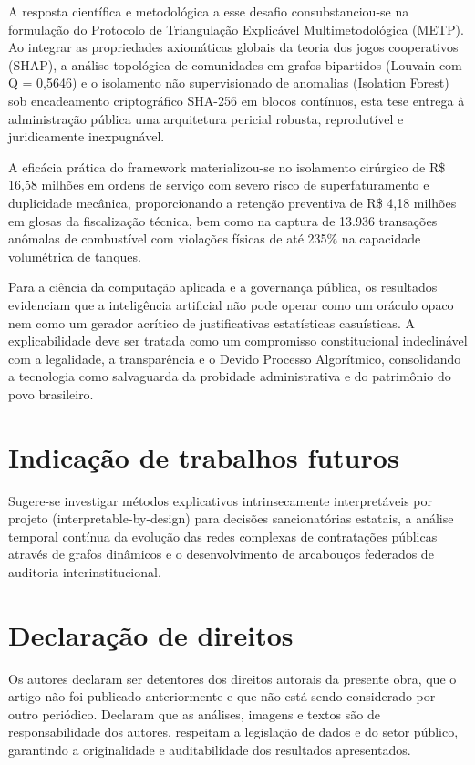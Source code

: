 \documentclass[12pt,a4paper]{article}
\begin{document}
A resposta científica e metodológica a esse desafio consubstanciou-se na formulação do Protocolo de Triangulação Explicável Multimetodológica (METP). Ao integrar as propriedades axiomáticas globais da teoria dos jogos cooperativos (SHAP), a análise topológica de comunidades em grafos bipartidos (Louvain com Q = 0,5646) e o isolamento não supervisionado de anomalias (Isolation Forest) sob encadeamento criptográfico SHA-256 em blocos contínuos, esta tese entrega à administração pública uma arquitetura pericial robusta, reprodutível e juridicamente inexpugnável.

A eficácia prática do framework materializou-se no isolamento cirúrgico de R\$ 16,58 milhões em ordens de serviço com severo risco de superfaturamento e duplicidade mecânica, proporcionando a retenção preventiva de R\$ 4,18 milhões em glosas da fiscalização técnica, bem como na captura de 13.936 transações anômalas de combustível com violações físicas de até 235\% na capacidade volumétrica de tanques.

Para a ciência da computação aplicada e a governança pública, os resultados evidenciam que a inteligência artificial não pode operar como um oráculo opaco nem como um gerador acrítico de justificativas estatísticas casuísticas. A explicabilidade deve ser tratada como um compromisso constitucional indeclinável com a legalidade, a transparência e o Devido Processo Algorítmico, consolidando a tecnologia como salvaguarda da probidade administrativa e do patrimônio do povo brasileiro.


\section{Indicação de trabalhos futuros}

Sugere-se investigar métodos explicativos intrinsecamente interpretáveis por projeto (interpretable-by-design) para decisões sancionatórias estatais, a análise temporal contínua da evolução das redes complexas de contratações públicas através de grafos dinâmicos e o desenvolvimento de arcabouços federados de auditoria interinstitucional.


\section{Declaração de direitos}

Os autores declaram ser detentores dos direitos autorais da presente obra, que o artigo não foi publicado anteriormente e que não está sendo considerado por outro periódico. Declaram que as análises, imagens e textos são de responsabilidade dos autores, respeitam a legislação de dados e do setor público, garantindo a originalidade e auditabilidade dos resultados apresentados.
\end{document}
